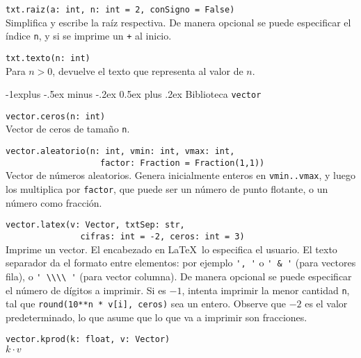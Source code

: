 \documentclass[10pt,landscape]{article}
\makeatletter
\renewcommand{\subsection}{\@startsection{subsection}{2}{0mm}%
                                {-1explus -.5ex minus -.2ex}%
                                {0.5ex plus .2ex}%
                                {\normalfont\normalsize\bfseries}}
\makeatother
\begin{document}
\begin{multicols}{3}
\begin{asparaitem}
\item  \verb|txt.raiz(a: int, n: int = 2, conSigno = False)| \\
\quad Simplifica y escribe la raíz respectiva. De manera opcional se puede especificar el \'indice \verb|n|, y si se imprime un \verb|+| al inicio.

\item \verb|txt.texto(n: int)| \\
\quad Para $n > 0$, devuelve el texto que representa al valor de $n$.
\end{asparaitem}

\subsection{Biblioteca \texttt{vector}}
\begin{asparaitem}
\item \verb|vector.ceros(n: int)| \\
\quad Vector de ceros de tamaño \verb|n|. 

\item \verb|vector.aleatorio(n: int, vmin: int, vmax: int,| \\
  \verb|                   factor: Fraction = Fraction(1,1))| \\
  \quad Vector de números aleatorios. Genera inicialmente enteros en \verb|vmin..vmax|, y luego los multiplica por \verb|factor|, que puede ser un n\'umero de punto flotante, o un n\'umero como fracci\'on.

\item \verb|vector.latex(v: Vector, txtSep: str,| \\
      \verb|               cifras: int = -2, ceros: int = 3)| \\
  \quad Imprime un vector. El encabezado en \LaTeX\ lo especifica el usuario. El texto separador da el formato entre elementos: por ejemplo \verb|', '| o \verb|' & '| (para vectores fila), o \verb|' \\\\ '| (para vector columna). De manera opcional se puede especificar el n\'umero de d\'igitos a imprimir. Si es $-1$, intenta imprimir la menor cantidad \verb|n|, tal que \verb|round(10**n * v[i], ceros)| sea un entero. Observe que $-2$ es el valor predeterminado, lo que asume que lo que va a imprimir son fracciones.

\item \verb|vector.kprod(k: float, v: Vector)| \\
\quad $k\cdot v$


\end{asparaitem}
\end{multicols}
\end{document}
